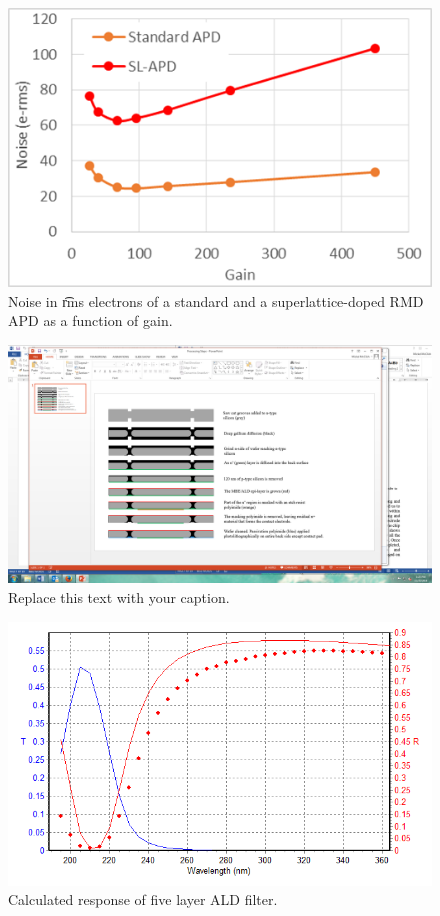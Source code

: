 \begin{figure}[h!]
\centering
\includegraphics[width=0.9\linewidth]{Figures/noise.png}
\caption{Noise in {\t rms} electrons of a standard and a superlattice-doped RMD APD as a function of gain.}
\label{fig:noise}
\end{figure}



\begin{figure}[h!]
\begin{center}
\includegraphics[width=0.7\columnwidth]{Figures/RMD_process.png}
\caption{Replace this text with your caption.}
\end{center}
\end{figure}

\begin{figure}[h!]
\begin{center}
\includegraphics[width=0.7\columnwidth]{Figures/fivelayer.png}
\caption{Calculated response of five layer ALD filter.}
\end{center}
\end{figure}

